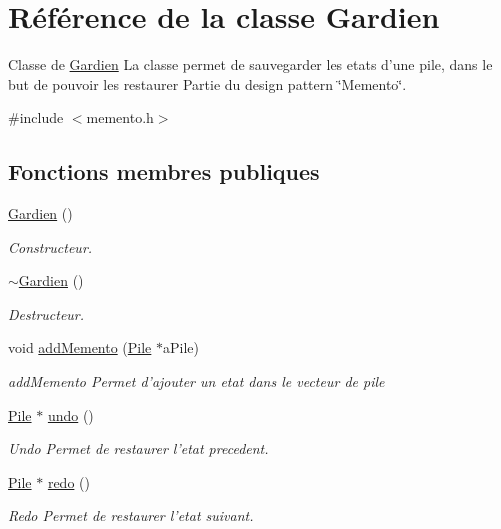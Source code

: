 \hypertarget{class_gardien}{\section{Référence de la classe Gardien}
\label{class_gardien}
}


Classe de \hyperlink{class_gardien}{Gardien} La classe permet de sauvegarder les etats d'une pile, dans le but de pouvoir les restaurer Partie du design pattern \char`\"{}\-Memento\char`\"{}.  




{\ttfamily \#include $<$memento.\-h$>$}

\subsection*{Fonctions membres publiques}
\begin{DoxyCompactItemize}
\item 
\hyperlink{class_gardien_aab8526f0f25e03d4cb1babbc1aa6d09e}{Gardien} ()
\begin{DoxyCompactList}\small\item\em Constructeur. \end{DoxyCompactList}\item 
\hypertarget{class_gardien_afef6202d924fef9d882bb40dfc4ac9fb}{\hyperlink{class_gardien_afef6202d924fef9d882bb40dfc4ac9fb}{$\sim$\-Gardien} ()}\label{class_gardien_afef6202d924fef9d882bb40dfc4ac9fb}

\begin{DoxyCompactList}\small\item\em Destructeur. \end{DoxyCompactList}\item 
void \hyperlink{class_gardien_ab152ac41cab1dc3f3a1dc0f143a54aa3}{add\-Memento} (\hyperlink{class_pile}{Pile} $\ast$a\-Pile)
\begin{DoxyCompactList}\small\item\em add\-Memento Permet d'ajouter un etat dans le vecteur de pile \end{DoxyCompactList}\item 
\hyperlink{class_pile}{Pile} $\ast$ \hyperlink{class_gardien_ac0145da9f36f0dbf7a6894723249dd1f}{undo} ()
\begin{DoxyCompactList}\small\item\em Undo Permet de restaurer l'etat precedent. \end{DoxyCompactList}\item 
\hyperlink{class_pile}{Pile} $\ast$ \hyperlink{class_gardien_a9fa7f0b6196b9b551b9ff9506d9ef8bf}{redo} ()
\begin{DoxyCompactList}\small\item\em Redo Permet de restaurer l'etat suivant. \end{DoxyCompactList}\end{DoxyCompactItemize}


